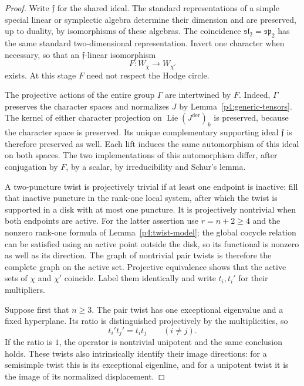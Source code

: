 \documentclass[11pt]{article}
\theoremstyle{plain}
\theoremstyle{definition}
\theoremstyle{remark}
\numberwithin{equation}{section}
\begin{document}
\begin{proof}
Write $\mathfrak f$ for the shared ideal.  The standard
representations of a simple special linear or symplectic
algebra determine their dimension and are preserved, up to
duality, by isomorphisms of these algebras.  The coincidence
$\mathfrak{sl}_2=\mathfrak{sp}_2$ has the same standard
two-dimensional representation.  Invert one character when
necessary, so that an $\mathfrak f$-linear isomorphism
\[
 F:W_\chi\longrightarrow W_{\chi'}
\]
exists.  At this stage $F$ need not respect the Hodge circle.

The projective actions of the entire group $\Gamma$ are
intertwined by $F$.  Indeed, $\Gamma$ preserves the character
spaces and normalizes $J$ by Lemma~\ref{p4:generic-tensors}.
The kernel of either character projection on
$\operatorname{Lie}(J^{\mathrm{der}})_k$ is preserved, because the
character space is preserved.  Its unique complementary supporting
ideal $\mathfrak f$ is therefore preserved as well.  Each lift induces
the same automorphism of this ideal on both spaces.  The two
implementations of this automorphism differ, after conjugation
by $F$, by a scalar, by irreducibility and Schur's lemma.

A two-puncture twist is projectively trivial if at least one
endpoint is inactive: fill that inactive puncture in the
rank-one local system, after which the twist is supported in
a disk with at most one puncture.  It is projectively nontrivial
when both endpoints are active.  For the latter assertion use
$r=n+2\ge4$ and the nonzero rank-one formula of
Lemma~\ref{p4:twist-model}; the global cocycle relation can be
satisfied using an active point outside the disk, so its
functional is nonzero as well as its direction.  The graph of
nontrivial pair twists is therefore the complete graph on the
active set.  Projective equivalence shows that the active sets
of $\chi$ and $\chi'$ coincide.  Label them identically and
write $t_i,t_i'$ for their multipliers.

Suppose first that $n\ge3$.  The pair twist has one exceptional
eigenvalue and a fixed hyperplane.  Its ratio is distinguished
projectively by the multiplicities, so
\begin{equation}\label{p4:sphere-pair-products}
 t_i't_j'=t_it_j\qquad(i\ne j).
\end{equation}
If the ratio is $1$, the operator is nontrivial unipotent and
the same conclusion holds.  These twists also intrinsically
identify their image directions: for a semisimple twist this
is its exceptional eigenline, and for a unipotent twist it is
the image of its normalized displacement.


\end{proof}
\end{document}
